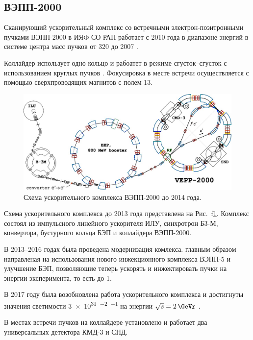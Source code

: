 \subsection{ВЭПП-2000}

Сканирующий ускорительный комплекс со встречными элек\-т\-рон-по\-зи\-т\-рон\-ны\-ми пучками ВЭПП-2000 в ИЯФ СО РАН работает с 2010 года в диапазоне энергий в системе центра масс пучков от \SI{320}{\MeVr} до \SI{2007}{\MeVr} \cite{Berkaev2012}.

Коллайдер использует одно кольцо и рабоатет в режиме сгусток--сгусток
с использованием круглых пучков \cite{Danilov:1996jw}.
Фокусировка в месте встречи осуществляется с помощью сверхпроводящих магнитов с полем \SI{13}{\teslaru}.

\begin{figure}[htbp]
    \centering
    \includegraphics[width=\textwidth]{img/vepp2knew.png}
    \caption{Схема ускорительного комплекса ВЭПП-2000 до 2014 года.}
    \label{fig:vepp2000}
\end{figure}

Схема ускорительного комплекса до 2013 года представлена на Рис.~f\ref{fig:vepp2000}.
Комплекс состоял из импульсного линейного ускорителя ИЛУ,
синхротрон Б3-М,
конвертора,
бустурного кольца БЭП
и коллайдера ВЭПП-2000.

В 2013--2016 годах была проведена модернизация комлекса.
главным образом направленая на использования нового инжекционного комплекса ВЭПП-5
и улучшение БЭП,
позволяющие теперь ускорять и инжектировать пучки на энергии эксперимента,
то есть до \SI{1}{\GeVr}.

В 2017 году была возобновлена работа ускорительного комплекса и достигнуты значения светимости
\SI{3e31}{\cmr^{-2} \sr^{-1}} на энергии $\sqrt{s} = \SI{2}{\GeVr}$ \cite{Shatunov:2018xfm}.

В местах встречи пучков на коллайдере установлено и работает два универсальных детектора КМД-3 и СНД.





